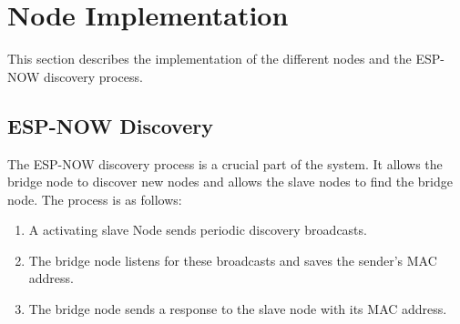 \section{Node Implementation} \label{sec:node_implemtenation}
This section describes the implementation of the different nodes and the ESP-NOW
discovery process.




    \subsection{ESP-NOW Discovery}
    The ESP-NOW discovery process is a crucial part of the system. It allows the
    bridge node to discover new nodes and allows the slave nodes to find the bridge
    node. The process is as follows:
    \begin{enumerate}
        \item A activating slave Node sends periodic discovery broadcasts.
        \item The bridge node listens for these broadcasts and saves the
        sender's MAC address.
        \item The bridge node sends a response to the slave node with its 
        MAC address.
         
    \end{enumerate}